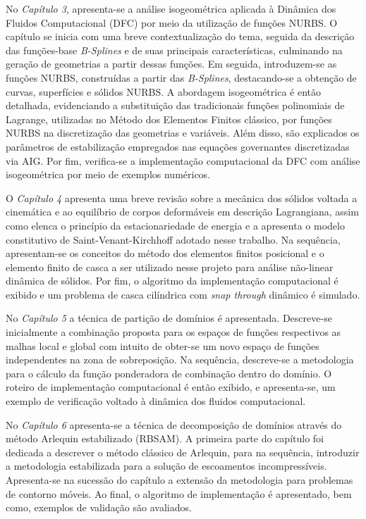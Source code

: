 No \textit{Capítulo 3}, apresenta-se a análise isogeométrica aplicada à Dinâmica dos Fluidos Computacional (DFC) por meio da utilização de funções NURBS. O capítulo se inicia com uma breve contextualização do tema, seguida da descrição das funções-base \textit{B-Splines} e de suas principais características, culminando na geração de geometrias a partir dessas funções. Em seguida, introduzem-se as funções NURBS, construídas a partir das \textit{B-Splines}, destacando-se a obtenção de curvas, superfícies e sólidos NURBS. A abordagem isogeométrica é então detalhada, evidenciando a substituição das tradicionais funções polinomiais de Lagrange, utilizadas no Método dos Elementos Finitos clássico, por funções NURBS na discretização das geometrias e variáveis. Além disso, são explicados os parâmetros de estabilização empregados nas equações governantes discretizadas via AIG. Por fim, verifica-se a implementação computacional da DFC com análise isogeométrica por meio de exemplos numéricos.

O \textit{Capítulo 4} apresenta uma breve revisão sobre a mecânica dos sólidos voltada a cinemática e ao equilíbrio de corpos deformáveis em descrição Lagrangiana, assim como elenca o princípio da estacionariedade de energia e a apresenta o modelo constitutivo de Saint-Venant-Kirchhoff adotado nesse trabalho. Na sequência, apresentam-se os conceitos do método dos elementos finitos posicional e o elemento finito de casca a ser utilizado nesse projeto para análise não-linear dinâmica de sólidos. Por fim, o algoritmo da implementação computacional é exibido e um problema de casca cilíndrica com \textit{snap through} dinâmico é simulado.

No \textit{Capítulo 5} a técnica de partição de domínios é apresentada.  Descreve-se inicialmente a combinação proposta para os espaços de funções respectivos as malhas local e global com intuito de obter-se um novo espaço de funções independentes na zona de sobreposição. Na sequência, descreve-se a metodologia para o cálculo da função ponderadora de combinação dentro do domínio.
O roteiro de implementação computacional é então exibido, e apresenta-se, um exemplo de verificação voltado à dinâmica dos fluidos computacional.

No \textit{Capítulo 6} apresenta-se a técnica de decomposição de domínios através do método Arlequin estabilizado (RBSAM). A primeira parte do capítulo foi dedicada a descrever o método clássico de Arlequin, para na sequência, introduzir a metodologia estabilizada para a solução de escoamentos incompressíveis. Apresenta-se na sucessão do capítulo a extensão da metodologia para problemas de contorno móveis. Ao final, o algoritmo de implementação é apresentado, bem como, exemplos de validação são avaliados.

